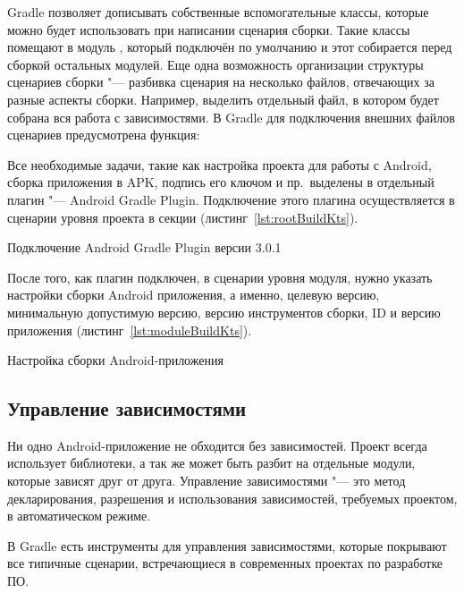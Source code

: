 Gradle позволяет дописывать собственные вспомогательные классы, которые можно будет использовать при написании сценария сборки.
Такие классы помещают в модуль , который подключён по умолчанию и этот собирается перед сборкой остальных модулей.
Еще одна возможность организации структуры сценариев сборки "--- разбивка сценария на несколько файлов, отвечающих за разные аспекты сборки.
Например, выделить отдельный файл, в котором будет собрана вся работа с зависимостями.
В Gradle для подключения внешних файлов сценариев предусмотрена функция:

Все необходимые задачи, такие как настройка проекта для работы с Android, сборка приложения в APK, подпись его ключом и пр.\ выделены в отдельный плагин "--- Android Gradle Plugin.
Подключение этого плагина осуществляется в сценарии уровня проекта в секции  (листинг~\ref{lst:rootBuildKts}).

\begin{listing}[H]
  \caption{Подключение Android Gradle Plugin версии 3.0.1}
  \label{lst:rootBuildKts}
\end{listing}

После того, как плагин подключен, в сценарии уровня модуля, нужно указать настройки сборки Android приложения, а именно, целевую версию, минимальную допустимую версию, версию инструментов сборки, ID и версию приложения (листинг~\ref{lst:moduleBuildKts}).

\begin{listing}[H]
  \caption{Настройка сборки Android-приложения}
  \label{lst:moduleBuildKts}
\end{listing}

\subsection{Управление зависимостями}
\label{subsec:libs}

Ни одно Android-приложение не обходится без зависимостей.
Проект всегда использует библиотеки, а так же может быть разбит на отдельные модули, которые зависят друг от друга.
Управление зависимостями "--- это метод декларирования, разрешения и использования зависимостей, требуемых проектом, в автоматическом режиме.

В Gradle есть инструменты для управления зависимостями, которые покрывают все типичные сценарии, встречающиеся в современных проектах по разработке ПО\@.

